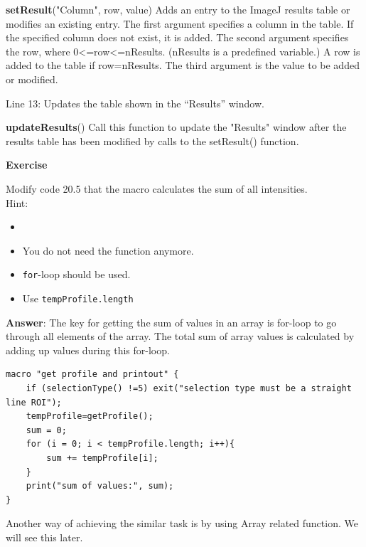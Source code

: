\documentclass[11pt,a4paper,oneside]{report}
\newenvironment{indentexercise}[1]
{{\setlength{\leftmargin}{2em}}
\textbf{Exercise \thesubsection-#1}
\begin{list}{}
	\item
}
{\end{list}}
\newenvironment{indentCom}
{\begin{list}{}
         {\setlength{\leftmargin}{1em}}
         \item[]
}
{\end{list}}
\newcommand{\ilcom}[1]{\texttt{\small#1}}
\begin{document}
\begin{itemize}
\begin{indentCom}
\textbf{setResult}("Column", row, value)
Adds an entry to the ImageJ results table or modifies an existing entry. The first argument specifies a column in the table. If the specified column does not exist, it is added. The second argument specifies the row, where 0<=row<=nResults. (nResults is a predefined variable.) A row is added to the table if row=nResults. The third argument is the value to be added or modified. 
\end{indentCom}
\item Line 13: Updates the table shown in the ``Results'' window. 

\begin{indentCom}
\textbf{updateResults}()
Call this function to update the "Results" window after the results table has been modified by calls to the setResult() function. 
\end{indentCom}
\end{itemize}

\begin{indentexercise}{1}
Modify code 20.5 that the macro calculates the sum of all intensities.\\

Hint:

\begin{itemize}
\item
\item You do not need the function anymore. 
\item \ilcom{for}-loop should be used.
\item Use \ilcom{tempProfile.length}
\end{itemize}

\item \textbf{Answer}: The key for getting the sum of values in an array is for-loop to go through all elements of the array. The total sum of array values is calculated by adding up values during this for-loop.   
\begin{lstlisting}[numbers=none]
macro "get profile and printout" {
	if (selectionType() !=5) exit("selection type must be a straight line ROI");
	tempProfile=getProfile();
	sum = 0;
	for (i = 0; i < tempProfile.length; i++){
		sum += tempProfile[i];
	}
	print("sum of values:", sum);
}  
\end{lstlisting}

Another way of achieving the similar task is by using Array related function. We will see this later. 
\end{indentexercise}
\end{document}
